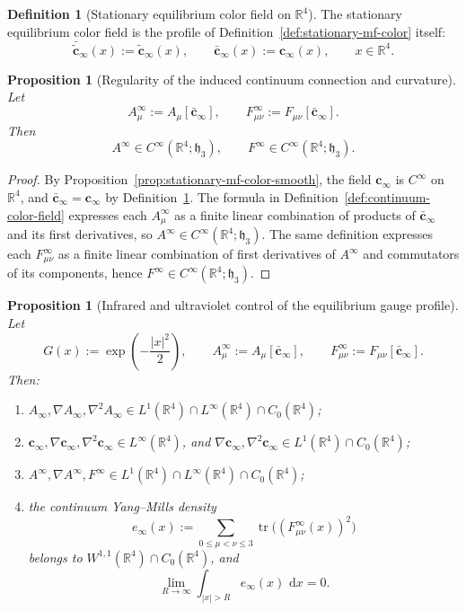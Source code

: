 \documentclass[11pt]{article}
\newtheorem{proposition}[theorem]{Proposition}
\theoremstyle{definition}
\newtheorem{definition}[theorem]{Definition}
\theoremstyle{remark}
\newcommand{\R}{\mathbb R}
\newcommand{\dd}{\,\mathrm d}
\newcommand{\tr}{\operatorname{tr}}
\newcommand{\mathfrakh}{\mathfrak h_3}
\begin{document}
\begin{definition}[Stationary equilibrium color field on \(\R^4\)]
\label{def:stationary-spacetime-color}
The stationary equilibrium color field is the profile of
Definition~\ref{def:stationary-mf-color} itself:
\[
\bar{\tilde{\mathbf c}}_\infty(x):=\tilde{\mathbf c}_\infty(x),
\qquad
\bar{\mathbf c}_\infty(x):=\mathbf c_\infty(x),
\qquad
x\in\R^4.
\]
\end{definition}

\begin{proposition}[Regularity of the induced continuum connection and curvature]
\label{prop:continuum-connection-regularity}
Let
\[
A_\mu^\infty:=A_\mu[\bar{\mathbf c}_\infty],
\qquad
F_{\mu\nu}^\infty:=F_{\mu\nu}[\bar{\mathbf c}_\infty].
\]
Then
\[
A^\infty\in C^\infty(\R^4;\mathfrakh),
\qquad
F^\infty\in C^\infty(\R^4;\mathfrakh).
\]
\end{proposition}

\begin{proof}
By Proposition~\ref{prop:stationary-mf-color-smooth}, the field
\(\mathbf c_\infty\) is \(C^\infty\) on \(\R^4\), and
\(\bar{\mathbf c}_\infty=\mathbf c_\infty\) by
Definition~\ref{def:stationary-spacetime-color}. The formula
in Definition~\ref{def:continuum-color-field} expresses each \(A_\mu^\infty\)
as a finite linear combination of products of \(\bar{\mathbf c}_\infty\) and
its first derivatives, so \(A^\infty\in C^\infty(\R^4;\mathfrakh)\). The same
definition expresses each \(F_{\mu\nu}^\infty\) as a finite linear combination
of first derivatives of \(A^\infty\) and commutators of its components, hence
\(F^\infty\in C^\infty(\R^4;\mathfrakh)\).
\end{proof}

\begin{proposition}[Infrared and ultraviolet control of the equilibrium gauge profile]
\label{prop:continuum-energy-tail}
Let
\[
G(x):=\exp\!\left(-\frac{|x|^2}{2}\right),
\qquad
A_\mu^\infty:=A_\mu[\bar{\mathbf c}_\infty],
\qquad
F_{\mu\nu}^\infty:=F_{\mu\nu}[\bar{\mathbf c}_\infty].
\]
Then:
\begin{enumerate}[leftmargin=1.5em,label=\textnormal{(\roman*)}]
\item \(A_\infty,\nabla A_\infty,\nabla^2A_\infty\in L^1(\R^4)\cap L^\infty(\R^4)\cap C_0(\R^4)\);
\item \(\mathbf c_\infty,\nabla\mathbf c_\infty,\nabla^2\mathbf c_\infty\in
L^\infty(\R^4)\), and \(\nabla\mathbf c_\infty,\nabla^2\mathbf c_\infty\in
L^1(\R^4)\cap C_0(\R^4)\);
\item \(A^\infty,\nabla A^\infty,F^\infty\in L^1(\R^4)\cap L^\infty(\R^4)\cap C_0(\R^4)\);
\item the continuum Yang--Mills density
\[
e_\infty(x):=
\sum_{0\le\mu<\nu\le3}\tr\!\bigl((F_{\mu\nu}^\infty(x))^2\bigr)
\]
belongs to \(W^{1,1}(\R^4)\cap C_0(\R^4)\), and
\[
\lim_{R\to\infty}\int_{|x|>R}e_\infty(x)\,\dd x=0.
\]
\end{enumerate}
\end{proposition}
\end{document}

